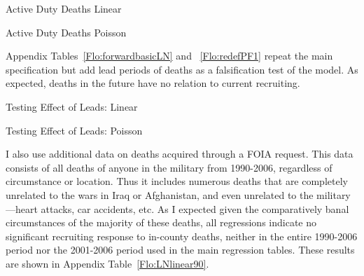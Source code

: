 \documentclass[12pt] {article}
\begin{document}


\pagebreak{}
\clearpage{}
\begin{table}
\caption{Active Duty Deaths Linear}
\label{Flo:Rdeathslinear}
\scalebox{0.9}{

}
\end{table}


\begin{table}
\caption{Active Duty Deaths Poisson}
\label{Flo:RdeathsP} 
\scalebox{0.85}{}
\end{table}


Appendix Tables~\ref{Flo:forwardbasicLN} and ~\ref{Flo:redefPF1} repeat the main specification but add lead periods of deaths as a falsification test of the model. As expected, deaths in the future have no relation to current recruiting. 


\clearpage{}
\begin{table}
\caption{Testing Effect of Leads: Linear}
\label{Flo:forwardbasicLN}
\scalebox{0.8}{
}
\end{table}

\pagebreak{}
\clearpage{}
\begin{table}
\caption{Testing Effect of Leads: Poisson}
\label{Flo:forwardPbasic}
\scalebox{0.9}{
}
\end{table}


I also use additional data on deaths acquired through a FOIA request. This data consists of all deaths of anyone in the military from 1990-2006, regardless of circumstance or location. Thus it includes numerous deaths that are completely unrelated to the wars in Iraq or Afghanistan, and even unrelated to the military---heart attacks, car accidents, etc. As I expected given the comparatively banal circumstances of the majority of these deaths, all regressions indicate no significant recruiting response to in-county deaths, neither in the entire 1990-2006 period nor the 2001-2006 period used in the main regression tables. These results are shown in Appendix Table~\ref{Flo:LNlinear90}.%
\end{document}
